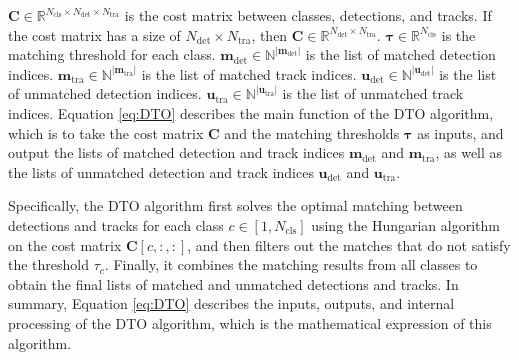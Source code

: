 $\mathbf{C} \in \mathbb{R}^{N_{\mathrm{cls}} \times N_{\mathrm{det}} \times N_{\mathrm{tra}}}$ is the cost matrix between classes, detections, and tracks. If the cost matrix has a size of $N_{\mathrm{det}} \times N_{\mathrm{tra}}$, then $\mathbf{C} \in \mathbb{R}^{N_{\mathrm{det}} \times N_{\mathrm{tra}}}$. $\boldsymbol{\tau} \in \mathbb{R}^{N_{\mathrm{cls}}}$ is the matching threshold for each class.  $\mathbf{m}_{\mathrm{det}} \in \mathbb{N}^{|\mathbf{m}_{\mathrm{det}}|}$ is the list of matched detection indices. $\mathbf{m}_{\mathrm{tra}} \in \mathbb{N}^{|\mathbf{m}_{\mathrm{tra}}|}$ is the list of matched track indices.  $\mathbf{u}_{\mathrm{det}} \in \mathbb{N}^{|\mathbf{u}_{\mathrm{det}}|}$ is the list of unmatched detection indices. $\mathbf{u}_{\mathrm{tra}} \in \mathbb{N}^{|\mathbf{u}_{\mathrm{tra}}|}$ is the list of unmatched track indices. Equation \eqref{eq:DTO} describes the main function of the DTO algorithm, which is to take the cost matrix $\mathbf{C}$ and the matching thresholds $\boldsymbol{\tau}$ as inputs, and output the lists of matched detection and track indices $\mathbf{m}_{\mathrm{det}}$ and $\mathbf{m}_{\mathrm{tra}}$, as well as the lists of unmatched detection and track indices $\mathbf{u}_{\mathrm{det}}$ and $\mathbf{u}_{\mathrm{tra}}$.


Specifically, the DTO algorithm first solves the optimal matching between detections and tracks for each class $c \in [1, N_{\mathrm{cls}}]$ using the Hungarian algorithm on the cost matrix $\mathbf{C}[c, :, :]$, and then filters out the matches that do not satisfy the threshold $\tau_c$. Finally, it combines the matching results from all classes to obtain the final lists of matched and unmatched detections and tracks. In summary, Equation \eqref{eq:DTO} describes the inputs, outputs, and internal processing of the DTO algorithm, which is the mathematical expression of this algorithm.



